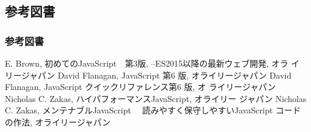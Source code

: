 \subsection{参考図書}
\begin{frame}
 \frametitle{参考図書}
\begin{thebibliography}{9}
  E. Brown, 初めてのJavaScript　第3版, --ES2015以降の最新ウェブ開発, オラ
       イリージャパン\label{ES2016}
 David Flanagan, JavaScript 第6 版, オライリージャパン
 David Flanagan, JavaScript クイックリファレンス第6 版, オ
	 ライリージャパン
 Nicholas C. Zakas, ハイパフォーマンスJavaScript, オライリー
	 ジャパン
 Nicholas C. Zakas, メンテナブルJavaScript 　読みやすく保守しやすいJavaScript 
コードの作法, オライリージャパン
\end{thebibliography}
\end{frame}
